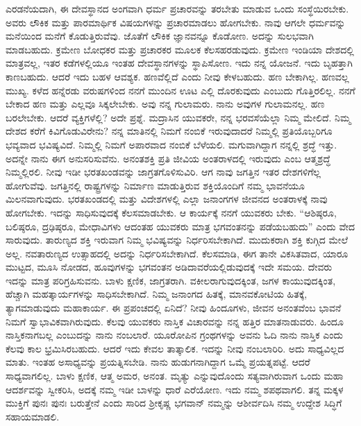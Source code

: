 \vskip 3pt

ಎರಡನೆಯದಾಗಿ, ಈ ದೇವಸ್ಥಾನದ ಅಂಗವಾಗಿ ಧರ್ಮ ಪ್ರಚಾರವನ್ನು ತರಬೇತು ಮಾಡುವ ಒಂದು ಸಂಸ್ಥೆಯಿರಬೇಕು. ಅವರು ಲೌಕಿಕ ಮತ್ತು ಪಾರಮಾರ್ಥಿಕ ವಿಷಯಗಳನ್ನು ಪ್ರಚಾರಮಾಡಲು ಹೋಗಬೇಕು. ನಾವು ಆಗಲೇ ಧರ್ಮವನ್ನು ಮನೆಯಿಂದ ಮನೆಗೆ ಕೊಡುತ್ತಿರುವೆವು. ಜೊತೆಗೆ ಲೌಕಿಕ ಜ್ಞಾನವನ್ನೂ ಕೊಡೋಣ. ಅದನ್ನು ಸುಲಭವಾಗಿ ಮಾಡಬಹುದು. ಕ್ರಮೇಣ ಬೋಧಕರ ಮತ್ತು ಪ್ರಚಾರಕರ ಮೂಲಕ ಕೆಲಸ\break ಹರಡುವುದು. ಕ್ರಮೇಣ ಇಂಡಿಯಾ ದೇಶದಲ್ಲಿ ಮಾತ್ರವಲ್ಲ, ಇತರ ಕಡೆಗಳಲ್ಲಿಯೂ ಇಂತಹ ದೇವಸ್ಥಾನಗಳನ್ನು ಸ್ಥಾಪಿಸೋಣ. ಇದು ನನ್ನ ಯೋಜನೆ. ಇದು ಬೃಹತ್ತಾಗಿ ಕಾಣಬಹುದು. ಆದರೆ ಇದು ಬಹಳ ಆವಶ್ಯಕ. ಹಣವೆಲ್ಲಿದೆ ಎಂದು ನೀವು ಕೇಳಬಹುದು. ಹಣ ಬೇಕಾಗಿಲ್ಲ. ಹಣವಲ್ಲ ಮುಖ್ಯ. ಕಳೆದ ಹನ್ನೆರಡು ವರುಷಗಳಿಂದ ನನಗೆ ಮುಂದಿನ ಊಟ ಎಲ್ಲಿ ದೊರಕುವುದು ಎಂಬುದು ಗೊತ್ತಿರಲಿಲ್ಲ. ನನಗೆ ಬೇಕಾದ ಹಣ ಮತ್ತು ಎಲ್ಲವೂ ಸಿಕ್ಕಲೇಬೇಕು. ಅವು ನನ್ನ ಗುಲಾಮರು. ನಾನು ಅವುಗಳ ಗುಲಾಮನಲ್ಲ. ಹಣ ಬರಲೇಬೇಕು. ಆದರೆ ವ್ಯಕ್ತಿಗಳೆಲ್ಲಿ? ಅದೇ ಪ್ರಶ್ನೆ. ಮದ್ರಾಸಿನ ಯುವಕರೇ, ನನ್ನ ಭರವಸೆಯೆಲ್ಲಾ ನಿಮ್ಮ ಮೇಲಿದೆ. ನಿಮ್ಮ ದೇಶದ ಕರೆಗೆ ಕಿವಿಗೊಡುವಿರೇನು? ನನ್ನ ಮಾತಿನಲ್ಲಿ ನಿಮಗೆ ನಂಬಿಕೆ ಇರುವುದಾದರೆ ನಿಮ್ಮಲ್ಲಿ ಪ್ರತಿಯೊಬ್ಬರಿಗೂ ಭವ್ಯವಾದ ಭವಿಷ್ಯವಿದೆ. ನಿಮ್ಮಲ್ಲಿ ನಿಮಗೆ ಅಪಾರವಾದ ನಂಬಿಕೆ ಬೆಳೆಯಲಿ. ಮಗುವಾಗಿದ್ದಾಗ ನನ್ನಲ್ಲಿ ಶ್ರದ್ಧೆ ಇತ್ತು. ಅದನ್ನೇ ನಾನು ಈಗ ಅನುಸರಿಸುವೆನು. ಅನಂತಶಕ್ತಿ ಪ್ರತಿ ಜೀವಿಯ ಅಂತರಾಳದಲ್ಲಿ ಇರುವುದು ಎಂಬ ಆತ್ಮಶ್ರದ್ಧೆ ನಿಮ್ಮಲ್ಲಿರಲಿ. ನೀವು ಇಡೀ ಭರತಖಂಡವನ್ನು ಜಾಗ್ರತಗೊಳಿಸುವಿರಿ. ಆಗ ನಾವು ಜಗತ್ತಿನ ಇತರ ದೇಶಗಳಿಗೆಲ್ಲ ಹೋಗುವೆವು. ಜಗತ್ತಿನಲ್ಲಿ ರಾಷ್ಟ್ರಗಳನ್ನು ನಿರ್ಮಾಣ ಮಾಡುತ್ತಿರುವ ಶಕ್ತಿಯೊಂದಿಗೆ ನಮ್ಮ ಭಾವನೆಯೂ ಮಿಲನವಾಗುವುದು. ಭರತಖಂಡದಲ್ಲಿ ಮತ್ತು ವಿದೇಶಗಳಲ್ಲಿ ಎಲ್ಲಾ ಜನಾಂಗಗಳ ಜೀವನದ ಅಂತರಾಳಕ್ಕೆ ನಾವು ಹೋಗಬೇಕು. ಇದನ್ನು ಸಾಧಿಸುವುದಕ್ಕೆ ಕೆಲಸಮಾಡಬೇಕು. ಆ ಕಾರ್ಯಕ್ಕೆ ನನಗೆ ಯುವಕರು ಬೇಕು. “ಆಶಿಷ್ಠರೂ, ಬಲಿಷ್ಠರೂ, ದ್ರಢಿಷ್ಠರೂ, ಮೇಧಾವಿಗಳು ಆದಂತಹ ಯುವಕರು ಮಾತ್ರ ಭಗವಂತನನ್ನು ಪಡೆಯಬಹುದು” ಎಂದು ವೇದ ಸಾರುವುದು. ತಾರುಣ್ಯದ ಶಕ್ತಿ ಇರುವಾಗ ನಿಮ್ಮ ಭವಿಷ್ಯವನ್ನು ನಿರ್ಧರಿಸಬೇಕಾಗಿದೆ. ಮುದುಕರಾಗಿ ಶಕ್ತಿ ಕುಗ್ಗಿದ ಮೇಲೆ ಅಲ್ಲ. ನವತಾರುಣ್ಯದ ಉತ್ಸಾಹದಲ್ಲಿ ಅದನ್ನು ನಿರ್ಧರಿಸಬೇಕಾಗಿದೆ. ಕೆಲಸಮಾಡಿ, ಈಗ ತಾನೇ ವಿಕಸಿತವಾದ, ಯಾರೂ ಮುಟ್ಟದ, ಮೂಸಿ ನೋಡದ, ಹೂವುಗಳನ್ನು ಭಗವಂತನ ಅಡಿದಾವರೆಯಲ್ಲಿಡುವುದಕ್ಕೆ ಇದೇ ಸಮಯ. ದೇವರು ಇದನ್ನು ಮಾತ್ರ ಪರಿಗ್ರಹಿಸುವನು. ಬಾಳು ಕ್ಷಣಿಕ, ಜಾಗ್ರತರಾಗಿ. ವಕೀಲರಾಗುವುದಕ್ಕಿಂತ, ಜಗಳ ಕಾಯುವುದಕ್ಕಿಂತ, ಹೆಚ್ಚಾಗಿ ಮಹತ್ಕಾರ್ಯಗಳನ್ನು ಸಾಧಿಸಬೇಕಾಗಿದೆ. ನಿಮ್ಮ ಜನಾಂಗದ ಹಿತಕ್ಕೆ, ಮಾನವಕೋಟಿಯ ಹಿತಕ್ಕೆ, ತ್ಯಾಗಮಾಡುವುದು ಮಹಾಕಾರ್ಯ. ಈ ಪ್ರಪಂಚದಲ್ಲಿ ಏನಿದೆ? ನೀವು ಹಿಂದೂಗಳು, ಜೀವನ ಅನಂತವೆಂಬ ಭಾವನೆ ನಿಮಗೆ ಸ್ವಾಭಾವಿಕವಾಗಿರುವುದು. ಕೆಲವು ಯುವಕರು ನಾಸ್ತಿಕ ವಿಚಾರವನ್ನು ನನ್ನ ಹತ್ತಿರ ಮಾತನಾಡುವರು. ಹಿಂದೂ ನಾಸ್ತಿಕನಾಗಬಲ್ಲ ಎಂಬುದನ್ನು ನಾನು ನಂಬಲಾರೆ. ಯೂರೋಪಿನ ಗ್ರಂಥಗಳನ್ನು ಅವನು ಓದಿ ನಾನು ನಾಸ್ತಿಕ ಎಂದು ಕೆಲವು ಕಾಲ ಭ್ರಮಿಸಿರಬಹುದು. ಆದರೆ ಇದು ಕೇವಲ ತಾತ್ಕಾಲಿಕ. ಇದನ್ನು ನೀವು ನಂಬಲಾರಿರಿ. ಅದು ಸಾಧ್ಯವಿಲ್ಲದ ಮಾತು. ಇಂತಹ ಅಸಾಧ್ಯವನ್ನು ಪ್ರಯತ್ನಿಸಬೇಡಿ. ನಾನು ಹುಡುಗನಾಗಿದ್ದಾಗ ಒಮ್ಮೆ ಪ್ರಯತ್ನಪಟ್ಟೆ. ಆದರೆ ಸಾಧ್ಯವಾಗಲಿಲ್ಲ. ಬಾಳು ಕ್ಷಣಿಕ, ಆತ್ಮ ಅಮರ, ಅನಂತ. ಮೃತ್ಯು ಎನ್ನುವುದೊಂದು ಸತ್ಯವಾಗಿರುವಾಗ ಒಂದು ಮಹಾ ಆದರ್ಶವನ್ನು ಸ್ವೀಕರಿಸಿ, ಅದಕ್ಕೆ ನಮ್ಮ ಇಡೀ ಬಾಳನ್ನು ಧಾರೆ ಎರೆಯೋಣ. ಇದು ನಮ್ಮ ಶಪಥವಾಗಲಿ. ತನ್ನ ಮಕ್ಕಳ ಮುಕ್ತಿಗೆ ಪುನಃ ಪುನಃ ಬರುತ್ತೇನೆ ಎಂದು ಸಾರಿದ ಶ‍್ರೀಕೃಷ್ಣ ಭಗವಾನ್​ ನಮ್ಮನ್ನು ಆಶೀರ್ವದಿಸಿ ನಮ್ಮ ಉದ್ದೇಶ ಸಿದ್ಧಿಗೆ ಸಹಾಯಮಾಡಲಿ.

